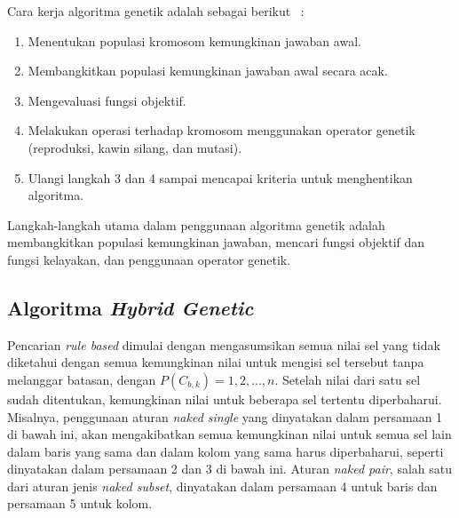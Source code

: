 Cara kerja algoritma genetik adalah sebagai berikut ~\cite{johanna:12:hybrid}:
\begin{enumerate}
\item Menentukan populasi kromosom kemungkinan jawaban awal.
\item Membangkitkan populasi kemungkinan jawaban awal secara acak.
\item Mengevaluasi fungsi objektif.
\item Melakukan operasi terhadap kromosom menggunakan operator genetik (reproduksi, kawin silang, dan mutasi).
\item Ulangi langkah 3 dan 4 sampai mencapai kriteria untuk menghentikan algoritma.
\end{enumerate}
Langkah-langkah utama dalam penggunaan algoritma genetik adalah membangkitkan populasi kemungkinan jawaban, mencari fungsi objektif dan fungsi kelayakan, dan penggunaan operator genetik.

\subsection{Algoritma \textit{Hybrid Genetic}}
\label{sec:subhybrid}

Pencarian \textit{rule based} dimulai dengan mengasumsikan semua nilai sel yang tidak diketahui dengan semua kemungkinan nilai untuk mengisi sel tersebut tanpa melanggar batasan, dengan \begin{math}P(C_{b,k}) = {1, 2, ..., n}\end{math}. Setelah nilai dari satu sel sudah ditentukan, kemungkinan nilai untuk beberapa sel tertentu diperbaharui. Misalnya, penggunaan aturan \textit{naked single} yang dinyatakan dalam persamaan 1 di bawah ini, akan mengakibatkan semua kemungkinan nilai untuk semua sel lain dalam baris yang sama dan dalam kolom yang sama harus diperbaharui, seperti dinyatakan dalam persamaan 2 dan 3 di bawah ini. Aturan \textit{naked pair}, salah satu dari aturan jenis \textit{naked subset}, dinyatakan dalam persamaan 4 untuk baris dan persamaan 5 untuk kolom. ~\cite{johanna:12:hybrid}

